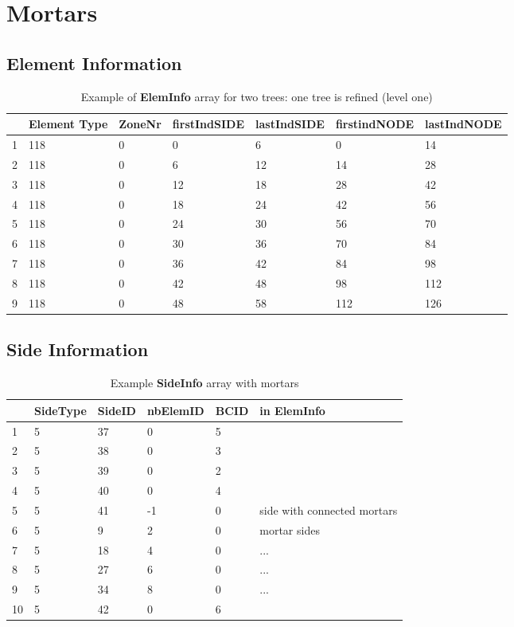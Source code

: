 \section{Mortars}

\subsection{Element Information}

\begin{table}[h!]
\centering
\begin{tabular}{|l|l|l|l|l|l|l|} \hline
  & Element Type & ZoneNr & firstIndSIDE & lastIndSIDE & firstindNODE & lastIndNODE \\ \hline
1 & 118 & 0 & 0 & 6 & 0 & 14 \\ \hline
2 & 118 & 0 & 6 & 12 & 14 & 28 \\ \hline
3 & 118 & 0 & 12 & 18 & 28 & 42 \\ \hline
4 & 118 & 0 & 18 & 24 & 42 & 56 \\ \hline
5 & 118 & 0 & 24 & 30 & 56 & 70 \\ \hline
6 & 118 & 0 & 30 & 36 & 70 & 84 \\ \hline
7 & 118 & 0 & 36 & 42 & 84 & 98 \\ \hline
8 & 118 & 0 & 42 & 48 & 98 & 112 \\ \hline
9 & 118 & 0 & 48 & 58 & 112 & 126 \\ \hline
\end{tabular}
\caption{Example of \textbf{ElemInfo} array for two trees: one tree is refined (level one)}
\end{table}

\newpage

\subsection{Side Information}

\begin{table}[h!]
\centering
\begin{tabular}{|l|l|l|l|l|l|}
\hline
 & SideType & SideID & nbElemID & BCID & in \textbf{ElemInfo}\\ \hline
1 & 5 & 37 & 0 & 5 &  \\ \hline
2 & 5 & 38 & 0 & 3 &  \\ \hline
3 & 5 & 39 & 0 & 2 &  \\ \hline
4 & 5 & 40 & 0 & 4 &  \\ \hline
5 & 5 & 41 & -1 & 0 &  side with connected mortars \\ \hline
6 & 5 & 9 & 2 & 0 &  mortar sides\\ \hline
7 & 5 & 18 & 4 & 0 &  ...\\ \hline
8 & 5 & 27 & 6 & 0 &  ...\\ \hline
9 & 5 & 34 & 8 & 0 &  ...\\ \hline
10 & 5 & 42 & 0 & 6 &  \\ \hline
\end{tabular}
\caption{Example \textbf{SideInfo} array with mortars}
\end{table}


